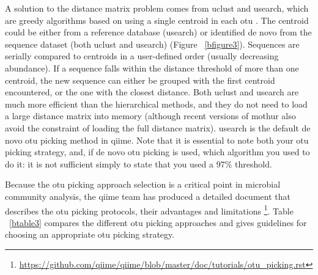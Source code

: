 A solution to the distance matrix problem comes from uclust and usearch, which are
greedy algorithms based on using a single centroid in each \gls{otu} \cite{Edgar2010}.
The centroid could be either from a reference database (usearch) or identified de
novo from the sequence dataset (both uclust and usearch) (Figure ~\ref{bfigure3}).
Sequences are serially compared to centroids in a user-defined order (usually decreasing
abundance). If a sequence falls within the distance threshold of more than one centroid,
the new sequence can either be grouped with the first centroid encountered, or the one
with the closest distance. Both uclust and usearch are much more efficient than the
hierarchical methods, and they do not need to load a large distance matrix into memory
(although recent versions of mothur also avoid the constraint of loading the full
distance matrix). usearch is the default de novo \gls{otu} picking method in \gls{qiime}.
Note that it is essential to note both your \gls{otu} picking strategy, and, if de novo
\gls{otu} picking is used, which algorithm you used to do it: it is not sufficient
simply to state that you used a 97\% threshold.

Because the \gls{otu} picking approach selection is a critical point in microbial
community analysis, the \gls{qiime} team has produced a detailed document that
describes the \gls{otu} picking protocols, their advantages and limitations
\footnote{\url{https://github.com/qiime/qiime/blob/master/doc/tutorials/otu_picking.rst}}.
Table ~\ref{btable3} compares the different \gls{otu} picking approaches and gives
guidelines for choosing an appropriate \gls{otu} picking strategy.

